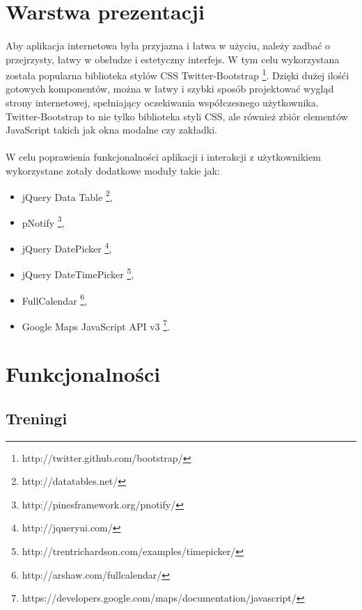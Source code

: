 
\section{Warstwa prezentacji} %
\label{sec:warstwa_aplikacji}
\paragraph{} %
\label{par:}
Aby aplikacja internetowa była przyjazna i łatwa w użyciu, należy zadbać o przejrzysty, łatwy w obsłudze i estetyczny interfejs. W tym celu wykorzystana została popularna biblioteka stylów CSS Twitter-Bootstrap \footnote{http://twitter.github.com/bootstrap/}. Dzięki dużej ilośći gotowych komponentów, można w łatwy i szybki sposób projektować wygląd strony internetowej, spełniający oczekiwania współczesnego użytkownika. Twitter-Bootstrap to nie tylko biblioteka styli CSS, ale również zbiór elementów JavaScript takich jak okna modalne czy zakładki.

\paragraph{} %
\label{par:}
W celu poprawienia funkcjonalności aplikacji i interakcji z użytkownikiem wykorzystane zotały dodatkowe moduły takie jak:
\begin{itemize}
\item jQuery Data Table \footnote{http://datatables.net/},
\item pNotify \footnote{http://pinesframework.org/pnotify/},
\item jQuery DatePicker \footnote{http://jqueryui.com/},
\item jQuery DateTimePicker \footnote{http://trentrichardson.com/examples/timepicker/},
\item FullCalendar \footnote{http://arshaw.com/fullcalendar/},
\item Google Maps JavaScript API v3 \footnote{https://developers.google.com/maps/documentation/javascript/}.
\end{itemize}


\section{Funkcjonalności} %
\label{sec:funkcjonalno_ci}

\subsection{Treningi} %
\label{sub:treningi}

